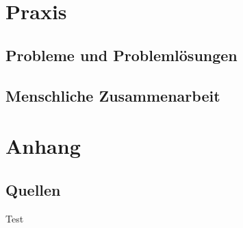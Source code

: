 \documentclass{report}
\begin{document}
\chapter{Praxis}

\section{Probleme und Problemlösungen}

\section{Menschliche Zusammenarbeit}

\chapter{Anhang}
\section{Quellen}
Test
\end{document}
